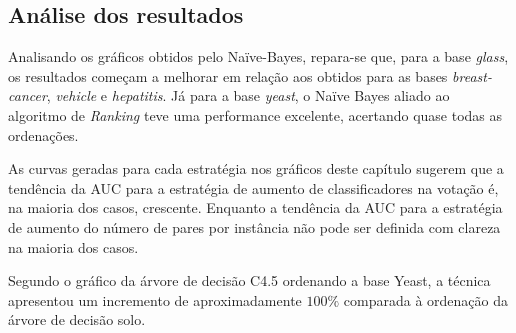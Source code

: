 \clearpage
\pagebreak


\subsection{Análise dos resultados}

Analisando os gráficos obtidos pelo Naïve-Bayes, repara-se que, para a base \emph{glass}, os resultados começam a melhorar em relação aos obtidos para as bases \emph{breast-cancer}, \emph{vehicle} e \emph{hepatitis}. Já para a base \emph{yeast}, o Naïve Bayes aliado ao algoritmo de \emph{Ranking} teve uma performance excelente, acertando quase todas as ordenações.

As curvas geradas para cada estratégia nos gráficos deste capítulo sugerem que a tendência da AUC para a estratégia de aumento de classificadores na votação é, na maioria dos casos, crescente. Enquanto a tendência da AUC para a estratégia de aumento do número de pares por instância não pode ser definida com clareza na maioria dos casos.

Segundo o gráfico da árvore de decisão C4.5 ordenando a base Yeast, a técnica apresentou um incremento de aproximadamente $100\%$ comparada à ordenação da árvore de decisão solo.
